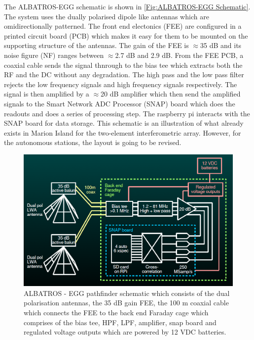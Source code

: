 \documentclass[12pt,a4paper]{report}
\begin{document}
The ALBATROS-EGG schematic is shown in \autoref{Fig:ALBATROS-EGG Schematic}. The system uses the dually polarised dipole like antennas which are omidirectionally patterned. The front end electonics (FEE) are configured in a printed circuit board (PCB) which makes it easy for them to be mounted on the supporting structure of the antennas. The gain of the FEE is $\approx$35 dB and its noise figure (NF) ranges between $\approx$2.7 dB and 2.9 dB. From the FEE PCB, a coaxial cable sends the signal thnrough to the bias tee which extracts both the RF and the DC without any degradation. \newline The high pass and the low pass filter rejects the low frequency signals and high frequency signals respectively. The signal is then amplified by a $\approx$20 dB amplifier which then send the amplified signals to the Smart Network ADC Processor (SNAP) board which does the readouts and does a series of processing step. The raspberry pi interacts with the SNAP board for data storage.  This schematic is an illustration of what already exists in Marion Island for the two-element interferometric array. However, for the autonomous stations, the layout is going to be revised. 

 		
		\begin{figure}[!ht]
				\begin{center}
					\includegraphics[width=0.9\linewidth]{Figures/ALBATROS-EGG-Schematic.PNG}
					\caption{ALBATROS - EGG pathfinder schematic which consists of the dual polarisation antennas, the 35 dB gain FEE, the 100 m coaxial cable which connects the FEE to the back end Faraday cage which comprises of the bias tee, HPF, LPF, amplifier, snap board and regulated voltage outputs which are powered by 12 VDC batteries.}
					\label{Fig:ALBATROS-EGG Schematic}
				\end{center}
		\end{figure}
			
\end{document}
